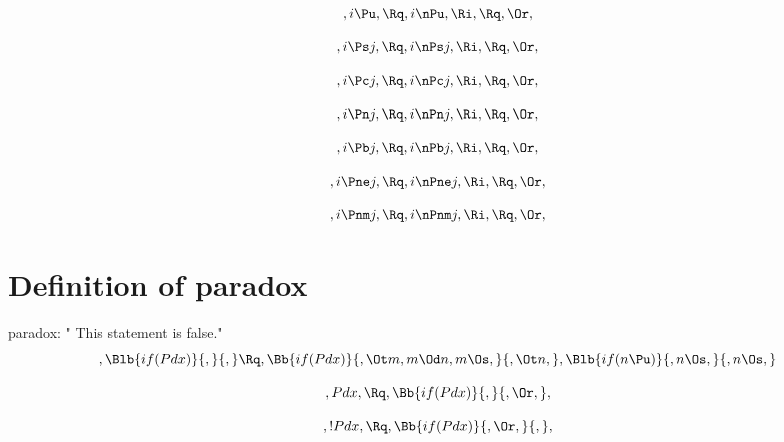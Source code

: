 \[, i \Pu, \Rq ,i \nPu, \Ri , \Rq , \Or ,\]

\[, i \Ps j, \Rq ,i \nPs j, \Ri , \Rq , \Or ,\]

\[, i \Pc j, \Rq ,i \nPc j, \Ri , \Rq , \Or ,\]

\[, i \Pn j, \Rq ,i \nPn j, \Ri , \Rq , \Or ,\]

\[, i \Pb j, \Rq ,i \nPb j, \Ri , \Rq , \Or ,\]

\[, i \Pne j, \Rq ,i \nPne j, \Ri , \Rq , \Or ,\]

\[, i \Pnm j, \Rq ,i \nPnm j, \Ri , \Rq , \Or ,\]

\newpage
\bigskip
\bigskip
\section{Definition of paradox}
  paradox:  " This statement is false." 
\[,\Blb{if(Pdx)}{,}{,} \Rq , \Bb{if(Pdx)}{, \Ot m, m \Od n, m \Os,}{, \Ot n,}, \Blb{if(n \Pu)}{, n \Os, }{, n \Os, }\]


\[, Pdx, \Rq , \Bb{if(Pdx)}{, }{, \Or,}, \]


\[, !Pdx, \Rq , \Bb{if(Pdx)}{, \Or,}{, }, \]



\bigskip
\bigskip
